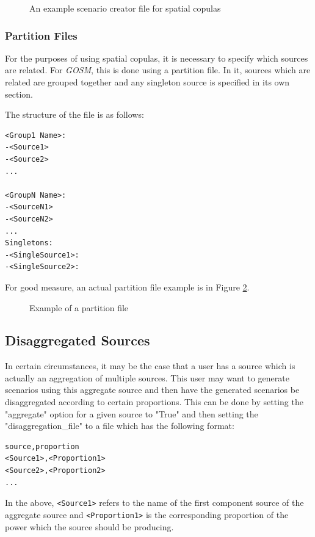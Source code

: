 \documentclass[11pt]{article}
\begin{document}
\begin{figure}
	\begin{framed}
	
	\end{framed}
	\caption{An example scenario creator file for spatial copulas}
	\label{spatial}
\end{figure}

\subsubsection{Partition Files}
For the purposes of using spatial copulas, it is necessary to specify which
sources are related. For \textit{GOSM}, this is done using a partition file.
In it, sources which are related are grouped together and any singleton source
is specified in its own section.

The structure of the file is as follows:
\begin{verbatim}
<Group1 Name>:
-<Source1>
-<Source2>
...

<GroupN Name>:
-<SourceN1>
-<SourceN2>
...
Singletons:
-<SingleSource1>:
-<SingleSource2>:
\end{verbatim}

For good measure, an actual partition file example is in Figure \ref{fig:partition}.

\begin{figure}[H]
	\begin{framed}
		
	\end{framed}
	\caption{Example of a partition file}
	\label{fig:partition}
\end{figure}

\subsection{Disaggregated Sources}
In certain circumstances, it may be the case that a user has a source which is actually an aggregation of multiple sources. This user may want to generate scenarios using this aggregate source and then have the generated scenarios be disaggregated according to certain proportions. This can be done by setting the "aggregate" option for a given source to "True" and then setting the "disaggregation\_file" to a file which has the following format:

\begin{verbatim}
source,proportion
<Source1>,<Proportion1>
<Source2>,<Proportion2>
...
\end{verbatim}
In the above, \texttt{<Source1>} refers to the name of the first component source of the aggregate source and \texttt{<Proportion1>} is the corresponding proportion of the power which the source should be producing.
\end{document}
